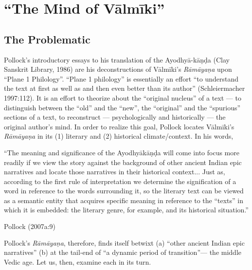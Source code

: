 \chapter{“The Mind of Vālmīki”}\label{chapter1}


\section{The Problematic}\label{sec1.1}

Pollock's introductory essays to his translation of the Ayodhyā-kāṇḍa (Clay Sanskrit Library, 1986) are his deconstructions of Vālmīki’s {\sl Rāmāyaṇa} upon “Plane 1 Philology”. “Plane 1 philology” is essentially an effort “to understand the text at first as well as and then even better than its author” (Schleiermacher 1997:112). It is an effort to theorize about the “original nucleus” of a text --- to distinguish between the “old” and the “new”, the “original” and the “spurious” sections of a text, to reconstruct --- psychologically and historically --- the original author's mind. In order to realize this goal, Pollock locates Vālmīki’s {\sl Rāmāyaṇa} in its (1) literary and (2) historical climate/context. In his words,  

\medskip
\begin{myquote}
“The meaning and significance of the Ayodhyākāṇḍa will come into focus more readily if we view the story against the background of other ancient Indian epic narratives and locate those narratives in their historical context... Just as, according to the first rule of  interpretation we determine the signification of a word in reference to the words surrounding it, so the literary text can be viewed as a semantic entity that acquires specific meaning in reference to the “texts” in which it is embedded: the literary genre, for example, and its historical situation.” 		
	       							         				      
\hfill  Pollock (2007a:9)
\end{myquote}

\medskip

Pollock's {\sl Rāmāyaṇa}, therefore, finds itself betwixt (a) “other ancient Indian epic narratives” (b) at the tail-end of “a dynamic period of transition”--- the middle Vedic age. Let us, then, examine each in its turn. 

